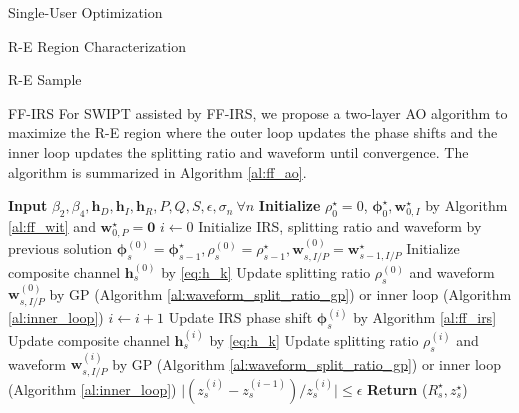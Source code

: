\documentclass{IEEEtran}
\begin{document}
\begin{section}{Single-User Optimization}
\begin{subsection}{R-E Region Characterization}
\begin{subsubsection}{R-E Sample}
			\begin{paragraph}{FF-IRS}
				For SWIPT assisted by FF-IRS, we propose a two-layer AO algorithm to maximize the R-E region where the outer loop updates the phase shifts and the inner loop updates the splitting ratio and waveform until convergence. The algorithm is summarized in Algorithm \ref{al:ff_ao}.
				\begin{algorithm}
					\caption{FF-IRS: AO Algorithm}
					\label{al:ff_ao}
					\begin{algorithmic}[1]
						\State \textbf{Input} $\beta_2,\beta_4,\boldsymbol{h}_D, \boldsymbol{h}_I, \boldsymbol{h}_R, P, Q, S, \epsilon, \sigma_n \ \forall n$
						\State \textbf{Initialize} $\rho_0^{\star} = 0$, $\boldsymbol{\phi}_0^{\star}, \boldsymbol{w}_{0,I}^{\star}$ by Algorithm \ref{al:ff_wit} and $\boldsymbol{w}_{0,P}^{\star} = \boldsymbol{0}$
						\State $i \gets 0$
						\State Initialize IRS, splitting ratio and waveform by previous solution $\boldsymbol{\phi}_s^{(0)} = \boldsymbol{\phi}_{s-1}^{\star}, \rho_s^{(0)} = \rho_{s-1}^{\star}, \boldsymbol{w}_{s,I/P}^{(0)}=\boldsymbol{w}_{s-1,I/P}^{\star}$
						\State Initialize composite channel $\boldsymbol{h}_s^{(0)}$ by \ref{eq:h_k}
						\State Update splitting ratio $\rho_s^{(0)}$ and waveform $\boldsymbol{w}_{s,I/P}^{(0)}$ by GP (Algorithm \ref{al:waveform_split_ratio_gp}) or inner loop (Algorithm \ref{al:inner_loop})
						\Repeat
						\State $i \gets i + 1$
						\State Update IRS phase shift $\boldsymbol{\phi}_s^{(i)}$ by Algorithm \ref{al:ff_irs}
						\State Update composite channel $\boldsymbol{h}_s^{(i)}$ by \ref{eq:h_k}
						\State Update splitting ratio $\rho_s^{(i)}$ and waveform $\boldsymbol{w}_{s,I/P}^{(i)}$ by GP (Algorithm \ref{al:waveform_split_ratio_gp}) or inner loop (Algorithm \ref{al:inner_loop})
						\Until $\lvert (z_s^{(i)}-z_s^{(i-1)}) / z_s^{(i)} \rvert \le \epsilon$
						\State \textbf{Return} ($R_s^\star, z_s^\star$)
						\EndFor
					\end{algorithmic}
				\end{algorithm}
			\end{paragraph}
		\end{subsubsection}
	\end{subsection}
\end{section}



\end{document}
